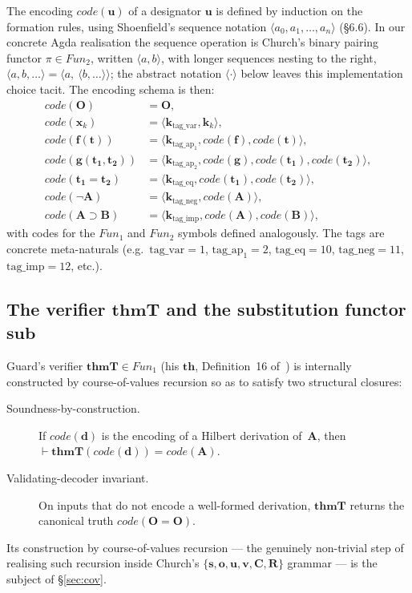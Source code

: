 \documentclass[11pt]{article}
\theoremstyle{plain}
\theoremstyle{definition}
\theoremstyle{remark}
\newcommand{\code}[1]{\mathit{code}(#1)}
\newcommand{\sub}{\mathbf{sub}}
\newcommand{\thmT}{\mathbf{thmT}}
\newcommand{\seq}[1]{\langle #1 \rangle}
\newcommand{\Fun}{\mathit{Fun}}
\begin{document}
The encoding $\code{\mathbf{u}}$ of a designator $\mathbf{u}$ is
defined by induction on the formation rules, using Shoenfield's
sequence notation $\seq{a_0, a_1, \ldots, a_n}$ ({\S}6.6).  In our
concrete Agda realisation the sequence operation is Church's binary
pairing functor $\pi \in \Fun_2$, written $\seq{a, b}$, with longer
sequences nesting to the right, $\seq{a, b, \ldots} = \seq{a,\ \seq{b, \ldots}}$;
the abstract notation $\seq{\cdot}$ below leaves this implementation
choice tacit.  The encoding schema is then:
\begin{align*}
\code{\mathbf{O}}              &= \mathbf{O}, \\
\code{\mathbf{x}_k}            &= \seq{\mathbf{k}_{\mathrm{tag\_var}}, \mathbf{k}_k}, \\
\code{\mathbf{f}(\mathbf{t})}  &= \seq{\mathbf{k}_{\mathrm{tag\_ap_1}}, \code{\mathbf{f}}, \code{\mathbf{t}}}, \\
\code{\mathbf{g}(\mathbf{t_1}, \mathbf{t_2})} &= \seq{\mathbf{k}_{\mathrm{tag\_ap_2}}, \code{\mathbf{g}}, \code{\mathbf{t_1}}, \code{\mathbf{t_2}}}, \\
\code{\mathbf{t_1} = \mathbf{t_2}} &= \seq{\mathbf{k}_{\mathrm{tag\_eq}}, \code{\mathbf{t_1}}, \code{\mathbf{t_2}}}, \\
\code{\neg \mathbf{A}}         &= \seq{\mathbf{k}_{\mathrm{tag\_neg}}, \code{\mathbf{A}}}, \\
\code{\mathbf{A} \supset \mathbf{B}} &= \seq{\mathbf{k}_{\mathrm{tag\_imp}}, \code{\mathbf{A}}, \code{\mathbf{B}}},
\end{align*}
with codes for the $\Fun_1$ and $\Fun_2$ symbols defined analogously.
The tags are concrete meta-naturals (e.g.\ $\mathrm{tag\_var}=1$,
$\mathrm{tag\_ap_1}=2$, $\mathrm{tag\_eq}=10$, $\mathrm{tag\_neg}=11$,
$\mathrm{tag\_imp}=12$, etc.).

\subsection{The verifier $\thmT$ and the substitution functor $\sub$}

Guard's verifier $\thmT \in \Fun_1$ (his $\mathbf{th}$, Definition~16
of~\cite{Guard1963}) is internally constructed by course-of-values
recursion so as to satisfy two structural closures:
\begin{description}
\item[Soundness-by-construction.] If $\code{\mathbf{d}}$ is the
encoding of a Hilbert derivation of~$\mathbf{A}$, then
$\vdash \thmT(\code{\mathbf{d}}) = \code{\mathbf{A}}$.

\item[Validating-decoder invariant.] On inputs that do not
encode a well-formed derivation, $\thmT$ returns the canonical truth
$\code{\mathbf{O} = \mathbf{O}}$.
\end{description}
Its construction by course-of-values recursion --- the genuinely
non-trivial step of realising such recursion inside Church's
$\{\mathbf{s},\mathbf{o},\mathbf{u},\mathbf{v},\mathbf{C},\mathbf{R}\}$
grammar --- is the subject of {\S}\ref{sec:cov}.
\end{document}
